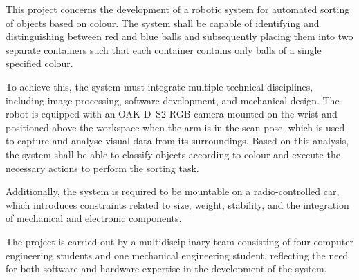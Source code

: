 This project concerns the development of a robotic system for automated
sorting of objects based on colour. The system shall be capable of
identifying and distinguishing between red and blue balls and subsequently
placing them into two separate containers such that each container contains
only balls of a single specified colour.

To achieve this, the system must integrate multiple technical disciplines, including image processing, software development, and mechanical design. The robot is equipped with an OAK-D~S2 RGB camera mounted on the wrist and positioned above the workspace when the arm is in the scan pose, which is used to capture and analyse visual data from its surroundings. Based on this analysis, the system shall be able to classify objects according to colour and execute the necessary actions to perform the sorting task.

Additionally, the system is required to be mountable on a radio-controlled car, which introduces constraints related to size, weight, stability, and the integration of mechanical and electronic components.

The project is carried out by a multidisciplinary team consisting of four computer engineering students and one mechanical engineering student, reflecting the need for both software and hardware expertise in the development of the system.
